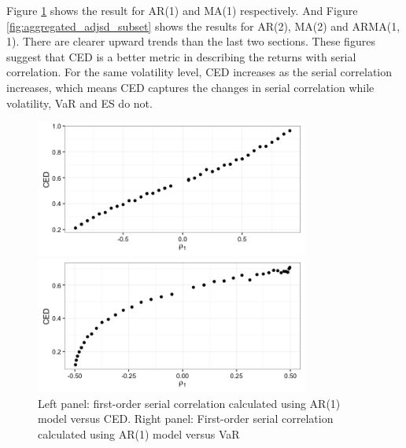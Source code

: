 \documentclass[11pt]{article}
\begin{document}
Figure \ref{fig:simulation_fixed_volatility_AR1_MA1} shows the result for AR(1) and MA(1) respectively. And Figure \ref{fig:aggregated_adjsd_subset} shows the results for AR(2), MA(2) and ARMA(1, 1). There are clearer upward trends than the last two sections. These figures suggest that CED is a better metric in describing the returns with serial correlation. For the same volatility level, CED increases as the serial correlation increases, which means CED captures the changes in serial correlation while volatility, VaR and ES do not. 


\begin{figure}[H]
  \centering
  \begin{minipage}[b]{0.48\textwidth}
    \includegraphics[width = 0.8\textwidth]{../figures/simulation/AR1_adjsd}
  \end{minipage}
  \hfill
  \begin{minipage}[b]{0.48\textwidth}
    \includegraphics[width = 0.8\textwidth]{../figures/simulation/MA1_adjsd}
  \end{minipage}
  \caption{Left panel: first-order serial correlation calculated using AR(1) model versus CED. Right panel: First-order serial correlation calculated using AR(1) model versus VaR}
  \label{fig:simulation_fixed_volatility_AR1_MA1}
\end{figure}
\end{document}
